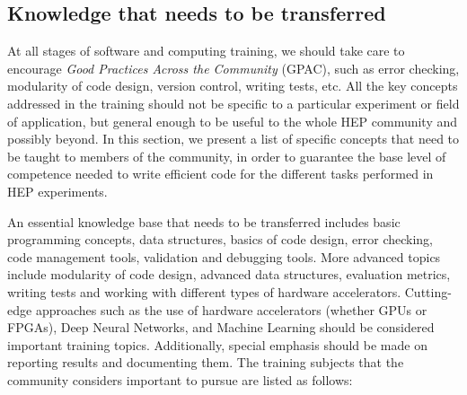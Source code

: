 \documentclass[12pt,a4paper]{article}
\begin{document}
\subsection{Knowledge that needs to be transferred}

At all stages of software and computing training, we should take care to
encourage \emph{Good Practices Across the Community} (GPAC), such as error
checking, modularity of code design, version control, writing tests, etc. All
the key concepts addressed in the training should not be specific to a
particular experiment or field of application, but general enough to be useful
to the whole HEP community and possibly beyond. In this section, we present a
list of specific concepts that need to be taught to members of the community, in
order to guarantee the base level of competence needed to write efficient code
for the different tasks performed in HEP experiments.
 
An essential knowledge base that needs to be transferred includes basic
programming concepts, data structures, basics of code design, error checking,
code management tools, validation and debugging tools. More advanced topics
include modularity of code design, advanced data structures, evaluation metrics,
writing tests and working with different types of hardware accelerators.
Cutting-edge approaches such as the use of hardware accelerators (whether GPUs
or FPGAs), Deep Neural Networks, and Machine Learning should be considered
important training topics. Additionally, special emphasis should be made on
reporting results and documenting them.
The training subjects that the community considers important to pursue are
listed as follows:
\end{document}
